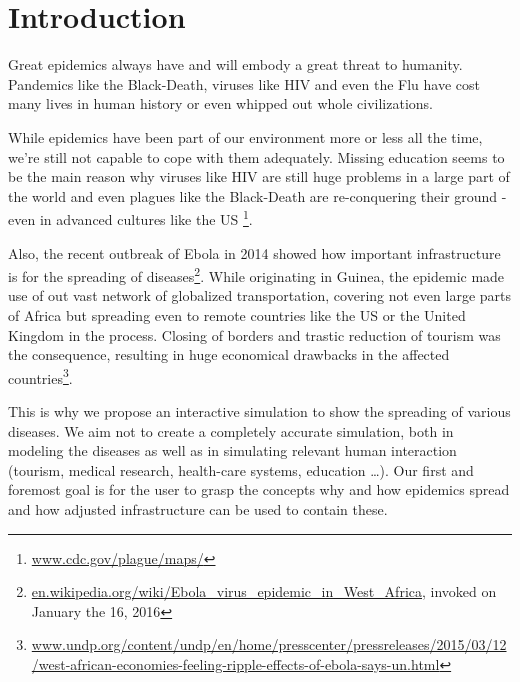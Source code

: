 \documentclass[table]{sig-alternate-05-2015}
\begin{document}
\section{Introduction}

Great epidemics always have and will embody a great threat to humanity. Pandemics like the Black-Death, viruses like HIV and even the Flu have cost many lives in human history or even whipped out whole civilizations.

While epidemics have been part of our environment more or less all the time, we're still not capable to cope with them adequately. Missing education seems to be the main reason why viruses like HIV are still huge problems in a large part of the world and even plagues like the Black-Death are re-conquering their ground - even in advanced cultures like the US \footnote{\url{www.cdc.gov/plague/maps/}}.

Also, the recent outbreak of Ebola in 2014 showed how important infrastructure is for the spreading of diseases\footnote{\url{en.wikipedia.org/wiki/Ebola_virus_epidemic_in_West_Africa}, invoked on January the 16, 2016}. While originating in Guinea, the epidemic made use of out vast network of globalized transportation, covering not even large parts of Africa but spreading even to remote countries like the US or the United Kingdom in the process. Closing of borders and trastic reduction of tourism was the consequence, resulting in huge economical drawbacks in the affected countries\footnote{\url{www.undp.org/content/undp/en/home/presscenter/pressreleases/2015/03/12/west-african-economies-feeling-ripple-effects-of-ebola-says-un.html}}.

This is why we propose an interactive simulation to show the spreading of various diseases. We aim not to create a completely accurate simulation, both in modeling the diseases as well as in simulating relevant human interaction (tourism, medical research, health-care systems, education \dots). Our first and foremost goal is for the user to grasp the concepts why and how epidemics spread and how adjusted infrastructure can be used to contain these.
\end{document}
